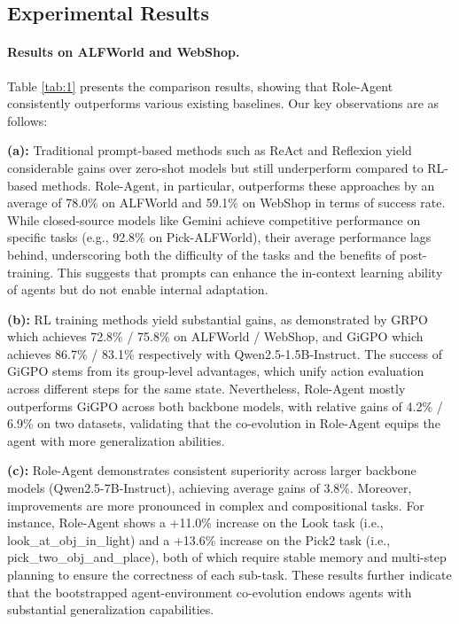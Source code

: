 \documentclass{llmxive}
\begin{document}
\subsection{Experimental Results}
\paragraph{Results on ALFWorld and WebShop.}
Table \ref{tab:1} presents the comparison results, showing that Role-Agent consistently outperforms various existing baselines. Our key observations are as follows:



\textbf{(a):} Traditional prompt-based methods such as ReAct and Reflexion yield considerable gains over zero-shot models but still underperform compared to RL-based methods. Role-Agent, in particular, outperforms these approaches by an average of 78.0\% on ALFWorld and 59.1\% on WebShop in terms of success rate. While closed-source models like Gemini achieve competitive performance on specific tasks (e.g., 92.8\% on Pick-ALFWorld), their average performance lags behind, underscoring both the difficulty of the tasks and the benefits of post-training. This suggests that prompts can enhance the in-context learning ability of agents but do not enable internal adaptation.



\textbf{(b):} RL training methods yield substantial gains, as demonstrated by GRPO  which achieves 72.8\% / 75.8\% on ALFWorld / WebShop, and GiGPO which achieves 86.7\% / 83.1\% respectively with Qwen2.5-1.5B-Instruct. The success of GiGPO stems from its group-level advantages, which unify action evaluation across different steps for the same state. Nevertheless, Role-Agent mostly outperforms GiGPO across both backbone models, with relative gains of 4.2\% / 6.9\% on two datasets, validating that the co-evolution in Role-Agent equips the agent with more generalization abilities.  

\textbf{(c):} Role-Agent demonstrates consistent superiority across larger backbone models (Qwen2.5-7B-Instruct), achieving average gains of 3.8\%. Moreover, improvements are more pronounced in complex and compositional tasks. For instance, Role-Agent shows a +11.0\% increase on the Look task (i.e., look\_at\_obj\_in\_light) and a +13.6\% increase on the Pick2 task (i.e., pick\_two\_obj\_and\_place), both of which require stable memory and multi-step planning to ensure the correctness of each sub-task. These results further indicate that the bootstrapped agent-environment co-evolution endows agents with substantial generalization capabilities.
\end{document}
